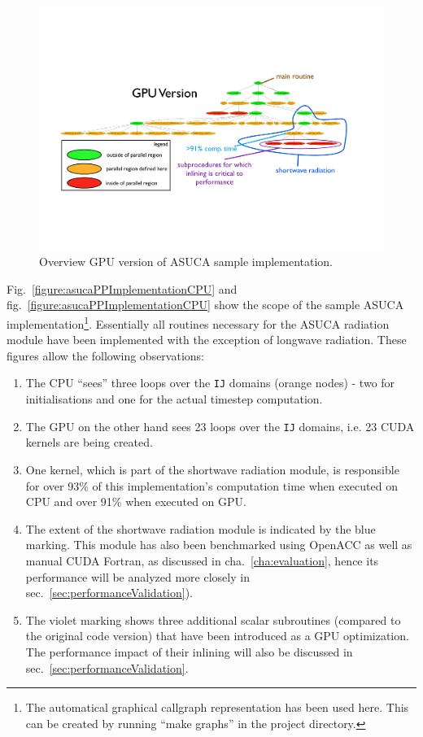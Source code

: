 \begin{figure}[htpb]
        \centering
        \includegraphics[width=14cm]{figures/asucaPPImplementationGPU}
        \caption[GPU Version of Sample Hybrid Fortran Implementation]{Overview GPU version of ASUCA sample implementation.}
        \label{figure:asucaPPImplementationGPU}
\end{figure}

Fig.~\ref{figure:asucaPPImplementationCPU} and fig.~\ref{figure:asucaPPImplementationCPU} show the scope of the sample ASUCA implementation\footnote{The automatical graphical callgraph representation has been used here. This can be created by running ``make graphs'' in the project directory.}. Essentially all routines necessary for the ASUCA radiation module have been implemented with the exception of longwave radiation. These figures allow the following observations:

\begin{enumerate}
 \item The CPU ``sees'' three loops over the \verb|IJ| domains (orange nodes) - two for initialisations and one for the actual timestep computation.
 \item The GPU on the other hand sees 23 loops over the \verb|IJ| domains, i.e. 23 CUDA kernels are being created.
 \item One kernel, which is part of the shortwave radiation module, is responsible for over 93\% of this implementation's computation time when executed on CPU and over 91\% when executed on GPU.
 \item The extent of the shortwave radiation module is indicated by the blue marking. This module has also been benchmarked using OpenACC as well as manual CUDA Fortran, as discussed in cha.~\ref{cha:evaluation}, hence its performance will be analyzed more closely in sec.~\ref{sec:performanceValidation}).
 \item The violet marking shows three additional scalar subroutines (compared to the original code version) that have been introduced as a GPU optimization. The performance impact of their inlining will also be discussed in sec.~\ref{sec:performanceValidation}.
\end{enumerate}

